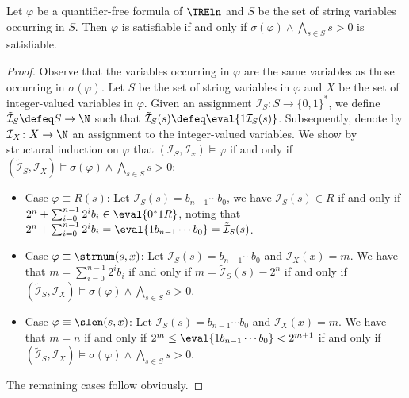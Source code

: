 \begin{lemma}
  Let $\varphi$ be a quantifier-free formula of $\TREln$ and $S$ be
  the set of string variables occurring in $S$. Then $\varphi$ is
  satisfiable if and only if $\sigma(\varphi) \wedge \bigwedge_{s\in
    S} s>0$ is satisfiable.
\end{lemma}
\begin{proof}
  Observe that the variables occurring in $\varphi$ are the same
  variables as those occurring in $\sigma(\varphi)$. Let $S$ be the
  set of string variables in $\varphi$ and $X$ be the set of
  integer-valued variables in $\varphi$. Given an assignment $\mathcal
  I_S \colon S \to \{0,1\}^*$, we define $\tilde{\mathcal{I}}_S \defeq
  S \to \N$ such that $\tilde{\mathcal I}_S(s) \defeq \eval{1 \mathcal
    I_S(s)}$. Subsequently, denote by $\mathcal I_X\colon X \to \N$ an
  assignment to the integer-valued variables. We show by structural
  induction on $\varphi$ that $(\mathcal I_S,\mathcal I_x) \models
  \varphi$ if and only if $(\tilde{\mathcal I}_S, \mathcal I_X)
  \models \sigma(\varphi) \wedge \bigwedge_{s\in S} s>0$:
%
  \begin{itemize}
  \item Case $\varphi \equiv R(s)$: Let $\mathcal I_S(s)=b_{n-1}\cdots
    b_0$, we have $\mathcal I_S(s)\in R$ if and only if $2^n +
    \sum_{i=0}^{n-1} 2^ib_i \in \eval{0^*1R}$, noting that $2^n +
    \sum_{i=0}^{n-1}2^i b_i=\eval{1b_{n-1}\cdots b_0}=\tilde{\mathcal
      I}_S(s)$.
  \item Case $\varphi \equiv \strnum(s,x)$: Let $\mathcal
    I_S(s)=b_{n-1}\cdots b_0$ and $\mathcal I_X(x)=m$. We have that
    $m=\sum_{i=0}^{n-1}2^ib_i$ if and only if $m=\tilde{\mathcal
      I}_S(s)-2^n$ if and only if $(\tilde{\mathcal I}_S,\mathcal
    I_X)\models \sigma(\varphi) \wedge \bigwedge_{s\in S} s>0$.
  \item Case $\varphi\equiv \slen(s,x)$: Let $\mathcal
    I_S(s)=b_{n-1}\cdots b_0$ and $\mathcal I_X(x)=m$. We have that
    $m=n$ if and only if $2^m\le \eval{1b_{n-1}\cdots b_0} <2^{m+1}$
    if and only if $(\tilde{\mathcal I}_S,\mathcal I_X)\models
    \sigma(\varphi) \wedge \bigwedge_{s\in S} s>0$.
  \end{itemize}
  The remaining cases follow obviously.
\end{proof}
